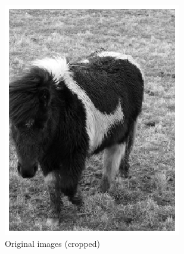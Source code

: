 \documentclass{l4proj}
\begin{document}
\begin{figure}[ht]
\begin{subfigure}[h!]{0.25\textwidth}
    \includegraphics[width=\textwidth]{images/unet/pony_2_grayscale.png}
    \caption{Original images (cropped)}
  \end{subfigure}
  \begin{subfigure}[h!]{0.25\textwidth}

\end{subfigure}
\end{figure}
\end{document}
